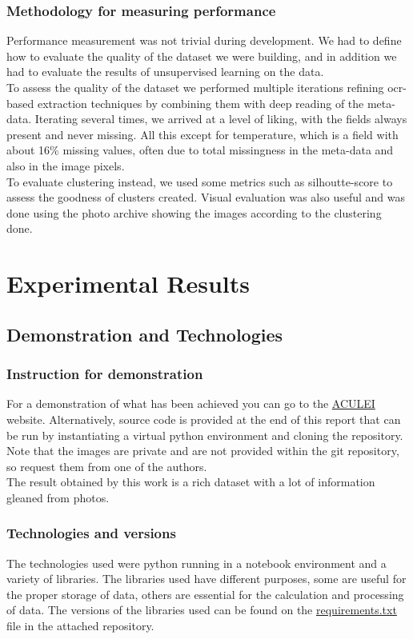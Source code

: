\documentclass[12pt,a4paper,twoside]{article}
\begin{document}
\subsubsection{Methodology for measuring performance}
Performance measurement was not trivial during development. We had to define how to evaluate the quality of the dataset we were building, and in addition we had to evaluate the results of unsupervised learning on the data. \\ To assess the quality of the dataset we performed multiple iterations refining ocr-based extraction techniques by combining them with deep reading of the meta-data. Iterating several times, we arrived at a level of liking, with the fields always present and never missing. All this except for temperature, which is a field with about 16\% missing values, often due to total missingness in the meta-data and also in the image pixels. \\ To evaluate clustering instead, we used some metrics such as silhoutte-score to assess the goodness of clusters created. Visual evaluation was also useful and was done using the photo archive showing the images according to the clustering done.

\section{Experimental Results}

\subsection{Demonstration and Technologies}

\subsubsection{Instruction for demonstration}
For a demonstration of what has been achieved you can go to the \href{https://aculei.xyz}{ACULEI} website. Alternatively, source code is provided at the end of this report that can be run by instantiating a virtual python environment and cloning the repository. Note that the images are private and are not provided within the git repository, so request them from one of the authors.\\
The result obtained by this work is a rich dataset with a lot of information gleaned from  photos.

\subsubsection{Technologies and versions}
The technologies used were python running in a notebook environment and a variety of libraries. 
The libraries used have different purposes, some are useful for the proper storage of data, others are essential for the calculation and processing of data. The versions of the libraries used can be found on the \href{https://github.com/micheledinelli/aculei-ai}{requirements.txt} file in the attached repository. 
\end{document}
